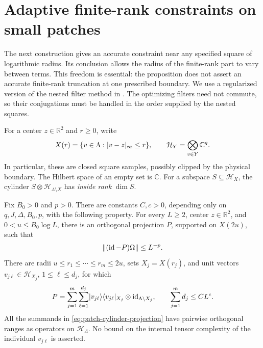 \section{Adaptive finite-rank constraints on small patches}
\label{sec:patches}

The next construction gives an accurate constraint near any specified
square of logarithmic radius.  Its conclusion allows the radius of the
finite-rank part to vary between terms.  This freedom is essential:
the proposition does not assert an accurate finite-rank truncation at
one prescribed boundary.  We use a regularized version of the nested
filter method in \cite{RepoAreaLaw}.  The optimizing filters need not
commute, so their conjugations must be handled in the order supplied by
the nested squares.

For a center \(z\in\mathbb R^2\) and \(r\geq 0\), write
\[
 X(r)=\{v\in\Lambda:\lvert v-z\rvert_\infty\leq r\},
 \qquad
 \mathcal H_Y=\bigotimes_{v\in Y}\mathbb C^q.
\]
In particular, these are closed square samples, possibly clipped by the
physical boundary.  The Hilbert space of an empty set is \(\mathbb C\).
For a subspace $S\subseteq\mathcal H_X$, the cylinder
$S\otimes\mathcal H_{\Lambda\setminus X}$ has \emph{inside rank} $\dim S$.

\begin{proposition}
\label{prop:patch}
Fix \(B_0>0\) and \(p>0\).  There are constants \(C,c>0\), depending
only on \(q,J,\Delta,B_0,p\), with the following property.  For every
\(L\geq2\), center \(z\in\mathbb R^2\), and
\(0<u\leq B_0\log L\), there is an orthogonal projection \(P\),
supported on \(X(2u)\), such that
\[
 \lVert (\operatorname{id}-P)\Omega\rVert\leq L^{-p}.
\]
There are radii \(u\leq r_1\leq\cdots\leq r_m\leq2u\), sets
\(X_j=X(r_j)\), and unit vectors
\(v_{j\ell}\in\mathcal H_{X_j}\), \(1\leq\ell\leq d_j\), for which
\begin{equation}
 P=\sum_{j=1}^m\sum_{\ell=1}^{d_j}
       \lvert v_{j\ell}\rangle\langle v_{j\ell}\rvert_{X_j}
          \otimes\operatorname{id}_{\Lambda\setminus X_j},
 \qquad
 \sum_{j=1}^m d_j\leq C L^c.
 \label{eq:patch-cylinder-projection}
\end{equation}
All the summands in \eqref{eq:patch-cylinder-projection} have pairwise
orthogonal ranges as operators on \(\mathcal H_\Lambda\).
No bound on the internal tensor complexity of the individual
\(v_{j\ell}\) is asserted.
\end{proposition}

